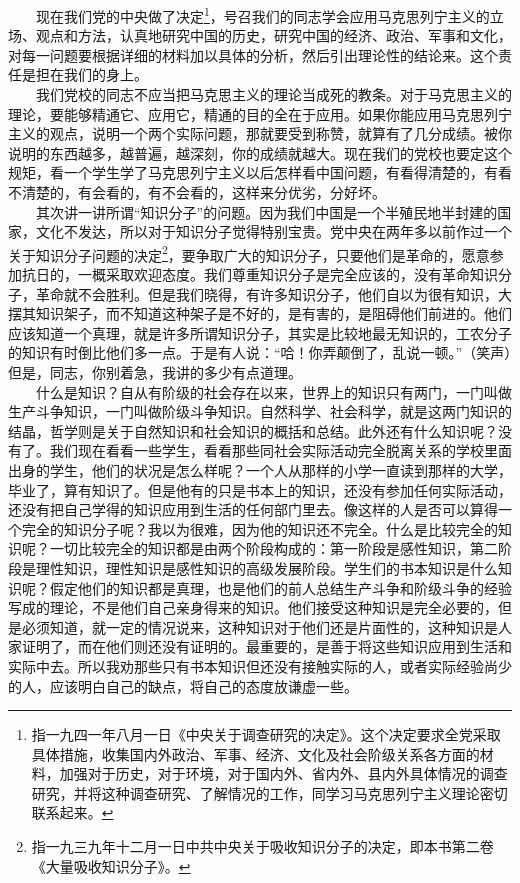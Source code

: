 \documentclass[cn,11pt,chinese]{elegantbook}
\begin{document}
　　现在我们党的中央做了决定\footnote[2]{ 指一九四一年八月一日《中央关于调查研究的决定》。这个决定要求全党采取具体措施，收集国内外政治、军事、经济、文化及社会阶级关系各方面的材料，加强对于历史，对于环境，对于国内外、省内外、县内外具体情况的调查研究，并将这种调查研究、了解情况的工作，同学习马克思列宁主义理论密切联系起来。}，号召我们的同志学会应用马克思列宁主义的立场、观点和方法，认真地研究中国的历史，研究中国的经济、政治、军事和文化，对每一问题要根据详细的材料加以具体的分析，然后引出理论性的结论来。这个责任是担在我们的身上。\\
　　我们党校的同志不应当把马克思主义的理论当成死的教条。对于马克思主义的理论，要能够精通它、应用它，精通的目的全在于应用。如果你能应用马克思列宁主义的观点，说明一个两个实际问题，那就要受到称赞，就算有了几分成绩。被你说明的东西越多，越普遍，越深刻，你的成绩就越大。现在我们的党校也要定这个规矩，看一个学生学了马克思列宁主义以后怎样看中国问题，有看得清楚的，有看不清楚的，有会看的，有不会看的，这样来分优劣，分好坏。\\
　　其次讲一讲所谓“知识分子”的问题。因为我们中国是一个半殖民地半封建的国家，文化不发达，所以对于知识分子觉得特别宝贵。党中央在两年多以前作过一个关于知识分子问题的决定\footnote[3]{ 指一九三九年十二月一日中共中央关于吸收知识分子的决定，即本书第二卷《大量吸收知识分子》。}，要争取广大的知识分子，只要他们是革命的，愿意参加抗日的，一概采取欢迎态度。我们尊重知识分子是完全应该的，没有革命知识分子，革命就不会胜利。但是我们晓得，有许多知识分子，他们自以为很有知识，大摆其知识架子，而不知道这种架子是不好的，是有害的，是阻碍他们前进的。他们应该知道一个真理，就是许多所谓知识分子，其实是比较地最无知识的，工农分子的知识有时倒比他们多一点。于是有人说：“哈！你弄颠倒了，乱说一顿。”（笑声）但是，同志，你别着急，我讲的多少有点道理。\\
　　什么是知识？自从有阶级的社会存在以来，世界上的知识只有两门，一门叫做生产斗争知识，一门叫做阶级斗争知识。自然科学、社会科学，就是这两门知识的结晶，哲学则是关于自然知识和社会知识的概括和总结。此外还有什么知识呢？没有了。我们现在看看一些学生，看看那些同社会实际活动完全脱离关系的学校里面出身的学生，他们的状况是怎么样呢？一个人从那样的小学一直读到那样的大学，毕业了，算有知识了。但是他有的只是书本上的知识，还没有参加任何实际活动，还没有把自己学得的知识应用到生活的任何部门里去。像这样的人是否可以算得一个完全的知识分子呢？我以为很难，因为他的知识还不完全。什么是比较完全的知识呢？一切比较完全的知识都是由两个阶段构成的：第一阶段是感性知识，第二阶段是理性知识，理性知识是感性知识的高级发展阶段。学生们的书本知识是什么知识呢？假定他们的知识都是真理，也是他们的前人总结生产斗争和阶级斗争的经验写成的理论，不是他们自己亲身得来的知识。他们接受这种知识是完全必要的，但是必须知道，就一定的情况说来，这种知识对于他们还是片面性的，这种知识是人家证明了，而在他们则还没有证明的。最重要的，是善于将这些知识应用到生活和实际中去。所以我劝那些只有书本知识但还没有接触实际的人，或者实际经验尚少的人，应该明白自己的缺点，将自己的态度放谦虚一些。\\
\end{document}
